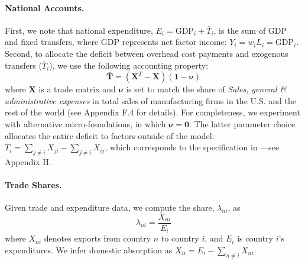 \documentclass[12pt]{article}
\begin{document}
\paragraph{National Accounts.} First, we note that national expenditure,  $E_i = \text{GDP}_i + \bar{T}_i$, is the sum of GDP and fixed transfers, where GDP represents net factor income:  $Y_i = w_i L_i = \text{GDP}_i$. Second, to allocate the deficit between overhead cost payments and exogenous transfers ($\bar{T}_i$), we use the following accounting property:
\begin{equation}
\mathbf{\bar T}=(\mathbf{X}^{T}-\mathbf{X})(\mathbf{1}-\boldsymbol{\nu})
\end{equation}
where $\mathbf{X}$ is a trade matrix and $\boldsymbol{\nu}$ is set to match the share of \textit{Sales, general \& administrative expenses} in total sales of manufacturing firms in the U.S. and the rest of the world (see Appendix F.4 for details). For completeness, we experiment with alternative micro-foundations, in which $\mathbf{\nu} = \mathbf{0}$. The latter parameter choice allocates the entire deficit to factors outside of the model: $\bar{T}_i = \sum_{j\neq i} X_{ji} - \sum_{j\neq i} X_{ij}$, which corresponds to the specification in \citet{DEK}---see Appendix H.

 






\paragraph{Trade Shares.} Given trade and expenditure data, we compute the share, $\lambda_{ni}$, as
\begin{equation}
\lambda_{ni} = \frac{X_{ni}}{E_i}\end{equation}
where  $X_{ni}$ denotes exports from country $n$ to country $i$, and $E_i$ is country $i$'s expenditures.  We infer domestic absorption as $X_{ii} = E_i-\sum_{n\neq i}X_{ni} $. 
\end{document}
